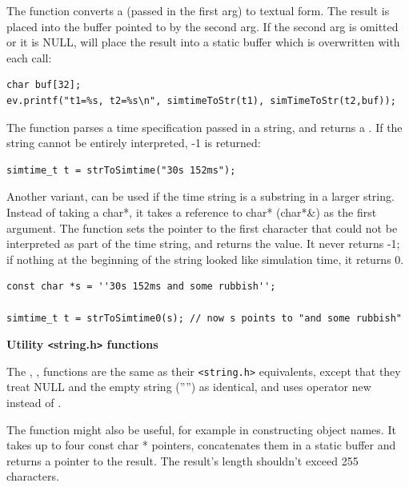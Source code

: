 The  function converts a 
(passed in the first arg) to textual form. The result is placed into
the buffer pointed to by the second arg. If the second arg is omitted
or it is NULL,  will place the result into a
static buffer which is overwritten with each call:

\begin{verbatim}
char buf[32];
ev.printf("t1=%s, t2=%s\n", simtimeToStr(t1), simTimeToStr(t2,buf));
\end{verbatim}


The  function parses a time specification passed
in a string, and returns a . If the string cannot
be entirely interpreted, -1 is returned:

\begin{verbatim}
simtime_t t = strToSimtime("30s 152ms");
\end{verbatim}

Another variant,  can be used if the time
string is a substring in a larger string. Instead of taking a char*,
it takes a reference to char* (char*\&) as the first argument.  The
function sets the pointer to the first character that could not be
interpreted as part of the time string, and returns the value. It
never returns -1; if nothing at the beginning of the string looked
like simulation time, it returns 0.

\begin{verbatim}
const char *s = ''30s 152ms and some rubbish'';

simtime_t t = strToSimtime0(s); // now s points to "and some rubbish"
\end{verbatim}

\textbf{Utility \texttt{<}string.h\texttt{>} functions}

\begin{sloppypar}
The , , 
functions are the same as their \texttt{<string.h>} equivalents,
except that they treat NULL and the empty string ('''') as identical,
and  uses operator new instead of
.
\end{sloppypar}

The  function might also be useful, for example
in constructing object names. It takes up to four const char *
pointers, concatenates them in a static buffer and returns a pointer
to the result. The result's length shouldn't exceed 255 characters.





